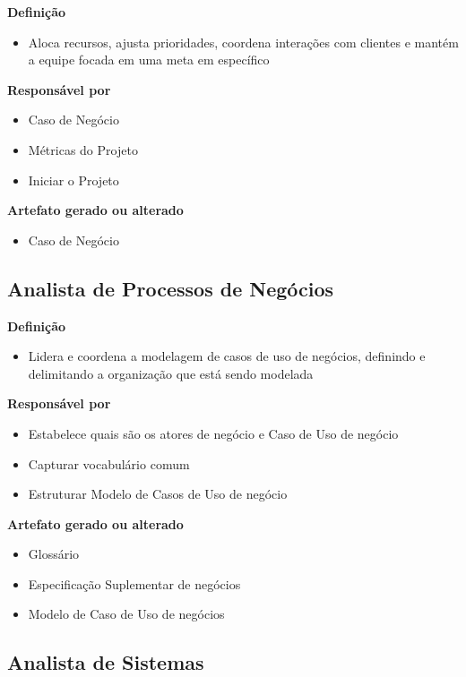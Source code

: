 \textbf{Definição}
\begin{itemize}
\item Aloca recursos, ajusta prioridades, coordena interações com clientes e mantém a equipe focada em uma meta em específico
\end{itemize}

\textbf{Responsável por}
\begin{itemize}
\item Caso de Negócio
\item Métricas do Projeto
\item Iniciar o Projeto
\end{itemize}

\textbf{Artefato gerado ou alterado}
\begin{itemize}
\item Caso de Negócio
\end{itemize}

\subsection{Analista de Processos de Negócios}

\textbf{Definição}
\begin{itemize}
\item Lidera e coordena a modelagem de casos de uso de negócios, definindo e delimitando a organização que está sendo modelada
\end{itemize}

\textbf{Responsável por}
\begin{itemize}
\item Estabelece quais são os atores de negócio e Caso de Uso de negócio
\item Capturar vocabulário comum
\item Estruturar Modelo de Casos de Uso de negócio
\end{itemize}

\textbf{Artefato gerado ou alterado}
\begin{itemize}
\item Glossário
\item Especificação Suplementar de negócios
\item Modelo de Caso de Uso de negócios
\end{itemize}

\subsection{Analista de Sistemas}

